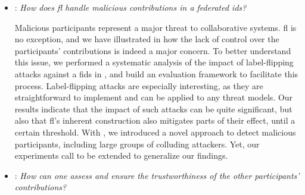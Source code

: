 \begin{itemize}[listparindent=\parindent,itemsep=.6\baselineskip]
  We proposed in  a novel approach to address this issue, \texttt{RADAR}, which leverages three components:
  However, because of the lack of appropriate distributed \gls{ids} datasets, we are limited in our evaluation.
  We then propose in  an unconventional approach to address this issue, leveraging constraint-based topology composition to generate synthetic datasets that mimic the characteristics of independent organizations.
  Consequently, while we have evidences that \gls{fl} can could be used to federate \glspl{ids} across heterogeneous data sources, this still represents a major research direction.

  
  \item {}: \emph{How does \gls{fl} handle malicious contributions in a federated \gls{ids}?}
  
  Malicious participants represent a major threat to collaborative systems.
  \Gls{fl} is no exception, and we have illustrated in  how the lack of control over the participants' contributions is indeed a major concern.
  To better understand this issue, we performed a systematic analysis of the impact of label-flipping attacks against a \gls{fids} in , and build an evaluation framework to facilitate this process.
  Label-flipping attacks are especially interesting, as they are straightforward to implement and can be applied to any threat models.
  Our results indicate that the impact of such attacks can be quite significant, but also that \gls{fl}'s inherent construction also mitigates parts of their effect, until a certain threshold.
  With , we introduced a novel approach to detect malicious participants, including large groups of colluding attackers.
  Yet, our experiments call to be extended to generalize our findings.

  
  \item {}: \emph{How can one assess and ensure the trustworthiness of the other participants' contributions?}
  

\end{itemize}
